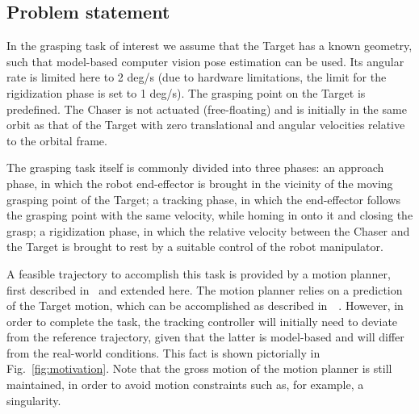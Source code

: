 \subsection{Problem statement}
%
In the grasping task of interest we assume that the Target has a known geometry, such that model-based computer vision pose estimation can be used. Its angular rate is limited here to 2 deg/s (due to hardware limitations, the limit for the rigidization phase is set to 1 deg/s). %
The grasping point on the Target is predefined. %
%
The Chaser is not actuated (free-floating) and is initially in the same orbit as that of the Target with zero translational and angular velocities relative to the orbital frame.

The grasping task itself is commonly divided into three phases: an approach phase, in which the robot end-effector is brought in the vicinity of the moving grasping point of the Target; a tracking phase, in which the end-effector follows the grasping point with the same velocity, while homing in onto it and closing the grasp; a rigidization phase, in which the relative velocity between the Chaser and the Target is brought to rest by a suitable control of the robot manipulator. 

A feasible trajectory to accomplish this task is provided by a motion planner, first described in~\cite{lampariello2013generating} and extended here. The motion planner relies on a prediction of the Target motion, which can be accomplished as described in~\cite{hillenbrand2005motion}~\cite{aghili2012prediction}. However, in order to complete the task, the tracking controller will initially need to deviate from the reference trajectory, given that the latter is model-based and will differ from the real-world conditions. This fact is shown pictorially in Fig.~\ref{fig:motivation}. Note that the gross motion of the motion planner is still maintained, in order to avoid motion constraints such as, for example, a singularity. 

